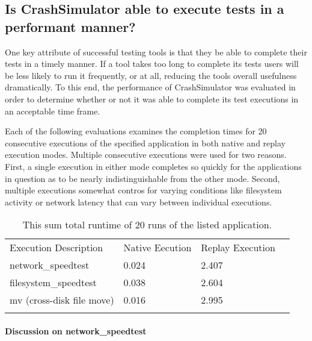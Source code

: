 \subsection{Is CrashSimulator able to execute tests in a performant manner?}


One key attribute of successful testing tools is that they be able to complete their tests in a timely manner.
If a tool takes too long to complete its tests users will be less likely to run it frequently, or at all,
reducing the tools overall usefulness dramatically. To this end, the performance of CrashSimulator was evaluated
in order to determine whether or not it was able to complete its test executions in an acceptable time frame.

Each of the following evaluations examines the completion times for 20 consecutive executions of the specified
application in both native and replay execution modes.  Multiple consecutive executions were used for two
reasons.  First, a single execution in either mode completes so quickly for the applications in question as to
be nearly indistinguishable from the other mode.  Second, multiple executions somewhat contros for varying
conditions like filesystem activity or network latency that can vary between individual executions.

    \begin{table}[H]
        \scriptsize{}
        \begin{tabular}{l  l  l  l}
            \toprule{}
                Execution Description & Native Eecution & Replay Execution\\
                network\_speedtest & 0.024 & 2.407 \\
                filesystem\_speedtest & 0.038 & 2.604 \\
                mv (cross-disk file move) & 0.016 & 2.995 \\
            \bottomrule{}
        \end{tabular}
        \caption{This sum total runtime of 20 runs of the listed application.}
    \end{table}

\paragraph{Discussion on network\_speedtest}

